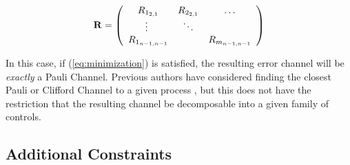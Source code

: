 \documentclass[aps,nofootinbib,pra,notitlepage,twocolumn]{revtex4-1}
\begin{document}
\begin{equation}\label{eq:vectorized_off_diagonal}
	\bold{R} = \left(\begin{array}{cccc}
		R_{1_{2,1}} & R_{2_{2,1}} & \ldots   \\ 
		\vdots\ & \ddots &    \\
		R_{1_{n-1,n-1}} &  &  R_{m_{n-1,n-1}} \\ 
	\end{array} 	
	\right)
\end{equation}

In this case, if (\ref{eq:minimization}) is satisfied, the resulting error channel will be \textit{exactly} a Pauli Channel. Previous authors have considered finding the closest Pauli or Clifford Channel to a given process \cite{Magesan2013}, but this does not have the restriction that the resulting channel be decomposable into a given family of controls. 


\subsection{Additional Constraints}
\end{document}
